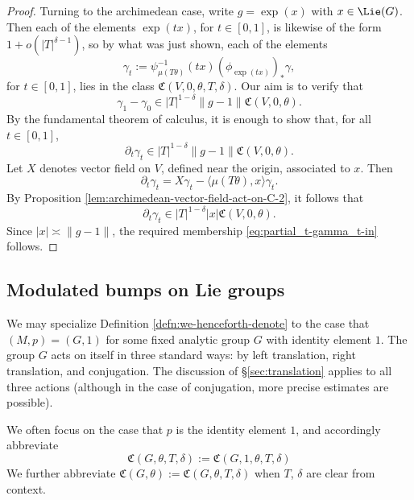 \begin{proof}
  Turning to the archimedean case, write $g = \exp(x)$ with $x \in \Lie(G)$.  Then each of the elements $\exp(t x)$, for $t \in [0,1]$, is likewise of the form $1 + o(|T|^{\delta-1})$, so by what was just shown, each of the elements
  \begin{equation*}
    \gamma_t := \psi_{\mu(T \theta)}^{-1}(t x) (\phi_{\exp(t x)})_* \gamma,
  \end{equation*}
  for $t \in [0,1]$, lies in the class $\mathfrak{C}(V,0,\theta,T,\delta)$.  Our aim is to verify that
  \begin{equation*}
    \gamma_1 - \gamma_0 \in |T|^{1-\delta} \|g - 1\| \mathfrak{C}(V,0,\theta).
  \end{equation*}
  By the fundamental theorem of calculus, it is enough to show that, for all $t \in [0,1]$,
  \begin{equation}\label{eq:partial_t-gamma_t-in}
    \partial_t \gamma_t  \in |T|^{1-\delta} \|g - 1\| \mathfrak{C}(V,0,\theta).
  \end{equation}
  Let $X$ denotes vector field on $V$, defined near the origin, associated to $x$.  Then
  \begin{equation*}
    \partial_t \gamma_t
    =
    X
    \gamma_t
    -
    \langle \mu(T \theta), x \rangle \gamma_t.
  \end{equation*}
  By Proposition \ref{lem:archimedean-vector-field-act-on-C-2}, it follows that
  \begin{equation*}
    \partial_t \gamma_t \in |T|^{1 - \delta} |x| \mathfrak{C}(V,0,\theta).
  \end{equation*}
  Since $|x| \asymp \|g-1\|$, the required membership \eqref{eq:partial_t-gamma_t-in} follows.
\end{proof}


\subsection{Modulated bumps on Lie groups}\label{sec:spec-group-sett}
We may specialize Definition \ref{defn:we-henceforth-denote} to the case that $(M,p) = (G,1)$ for some fixed analytic group $G$ with identity element $1$.  The group $G$ acts on itself in three standard ways: by left translation, right translation, and conjugation.  The discussion of \S\ref{sec:translation} applies to all three actions (although in the case of conjugation, more precise estimates are possible).

We often focus on the case that $p$ is the identity element $1$, and accordingly abbreviate 
\begin{equation}\label{eq:mathfrakcg-theta-t}
  \mathfrak{C}(G,\theta,T,\delta) := \mathfrak{C}(G,1,\theta,T,\delta)
\end{equation}
We further abbreviate $\mathfrak{C}(G,\theta) := \mathfrak{C}(G, \theta, T,\delta)$ when $T$, $\delta$ are clear from context.

